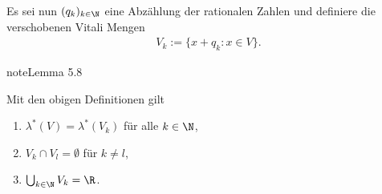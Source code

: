 \documentclass[letterpaper,10pt,german]{jupyterBook}
\begin{document}
\sphinxAtStartPar
Es sei nun \((q_k)_{k\in\N}\) eine Abzählung der rationalen Zahlen und definiere die verschobenen Vitali Mengen
\begin{equation*}
\begin{split}V_k :=\{x+q_k: x\in V\}.\end{split}
\end{equation*}\label{masstheorie/masstheorie:lemma-34}
\begin{sphinxadmonition}{note}{Lemma 5.8}



\sphinxAtStartPar
Mit den obigen Definitionen gilt
\begin{enumerate}
%
\item {} 
\sphinxAtStartPar
\(\lambda^\ast(V) = \lambda^\ast(V_k)\) für alle \(k\in\N\),

\item {} 
\sphinxAtStartPar
\(V_k\cap V_l=\emptyset\) für \(k\neq l\),

\item {} 
\sphinxAtStartPar
\(\bigcup_{k\in\N} V_k = \R\).

\end{enumerate}
\end{sphinxadmonition}
\end{document}
